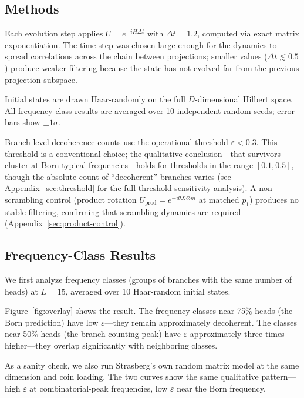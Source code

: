 \documentclass[aps,prd,twocolumn,showpacs,preprintnumbers,amsmath,amssymb,nofootinbib]{revtex4-2}
\begin{document}
\subsection{Methods}
\label{sec:methods}

Each evolution step applies $U = e^{-iH\Delta t}$ with $\Delta t = 1.2$,
computed via exact matrix exponentiation. The time step was chosen large enough
for the dynamics to spread correlations across the chain between projections;
smaller values ($\Delta t \lesssim 0.5$) produce weaker filtering because the
state has not evolved far from the previous projection subspace.

Initial states are drawn Haar-randomly on the full $D$-dimensional Hilbert space.
All frequency-class results are averaged over 10 independent random seeds; error
bars show $\pm 1\sigma$.

Branch-level decoherence counts use the operational threshold
$\varepsilon < 0.3$. This threshold is a conventional choice; the qualitative
conclusion---that survivors cluster at Born-typical frequencies---holds for
thresholds in the range $[0.1, 0.5]$, though the absolute count of
``decoherent'' branches varies (see Appendix~\ref{sec:threshold} for the full
threshold sensitivity analysis).
A non-scrambling control (product rotation
$U_\text{prod} = e^{-i\theta X}{}^{\otimes m}$ at matched $p_1$) produces no
stable filtering, confirming that scrambling dynamics are required
(Appendix~\ref{sec:product-control}).

\subsection{Frequency-Class Results}
\label{sec:freq-results}

We first analyze frequency classes (groups of branches with the same number of
heads) at $L = 15$, averaged over 10 Haar-random initial states.

Figure~\ref{fig:overlay} shows the result. The frequency classes near 75\% heads
(the Born prediction) have low $\varepsilon$---they remain approximately
decoherent. The classes near 50\% heads (the branch-counting peak) have
$\varepsilon$ approximately three times higher---they overlap significantly with
neighboring classes.

As a sanity check, we also run Strasberg's own random matrix model at the same
dimension and coin loading. The two curves show the same qualitative pattern---high
$\varepsilon$ at combinatorial-peak frequencies, low $\varepsilon$ near the Born
frequency.
\end{document}
